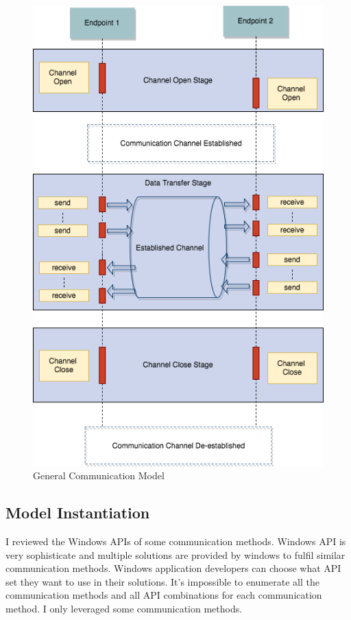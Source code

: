 \begin{figure}[H]
\centerline{\includegraphics[scale=0.55]{Figures/communicationhappen}}
 \caption{General Communication Model}
\label{communicationhappen}
\end{figure}

\subsection{Model Instantiation}
I reviewed the Windows APIs of some communication methods. Windows API is very sophisticate and multiple solutions are provided by windows to fulfil similar communication methods. Windows application developers can choose what API set they want to use in their solutions. It's impossible to enumerate all the communication methods and all API combinations for each communication method.  I only leveraged some communication methods. 

